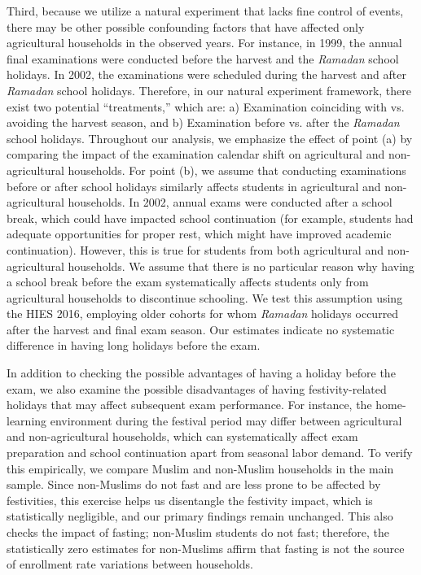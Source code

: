 \documentclass[12pt,letterpaper]{article}\usepackage[margin=1in]{geometry}
\newcommand{\0}{\ensuremath{\mbox{\boldmath $0$}}}
\begin{document}
Third, because we utilize a natural experiment that lacks fine control of events, there may be other possible confounding factors that have affected only agricultural households in the observed years. For instance, in 1999, the annual final examinations were conducted before the harvest and the \textit{Ramadan} school holidays. In 2002, the examinations were scheduled during the harvest and after \textit{Ramadan} school holidays. Therefore, in our natural experiment framework, there exist two potential ``treatments,'' which are: a) Examination coinciding with vs. avoiding the harvest season, and b) Examination before vs. after the \textit{Ramadan} school holidays. Throughout our analysis, we emphasize the effect of point (a) by comparing the impact of the examination calendar shift on agricultural and non-agricultural households. For point (b), we assume that conducting examinations before or after school holidays similarly affects students in agricultural and non-agricultural households. In 2002, annual exams were conducted after a school break, which could have impacted school continuation (for example, students had adequate opportunities for proper rest, which might have improved academic continuation). However, this is true for students from both agricultural and non-agricultural households. We assume that there is no particular reason why having a school break before the exam systematically affects students only from agricultural households to discontinue schooling. We test this assumption using the HIES 2016, employing older cohorts for whom \textit{Ramadan} holidays occurred after the harvest and final exam season. Our estimates indicate no systematic difference in having long holidays before the exam. 

In addition to checking the possible advantages of having a holiday before the exam, we also examine the possible disadvantages of having festivity-related holidays that may affect subsequent exam performance. For instance, the home-learning environment during the festival period may differ between agricultural and non-agricultural households, which can systematically affect exam preparation and school continuation apart from seasonal labor demand. To verify this empirically, we compare Muslim and non-Muslim households in the main sample. Since non-Muslims do not fast and are less prone to be affected by festivities, this exercise helps us disentangle the festivity impact, which is statistically negligible, and our primary findings remain unchanged. This also checks the impact of fasting; non-Muslim students do not fast; therefore, the statistically zero estimates for non-Muslims affirm that fasting is not the source of enrollment rate variations between households. 
\end{document}
